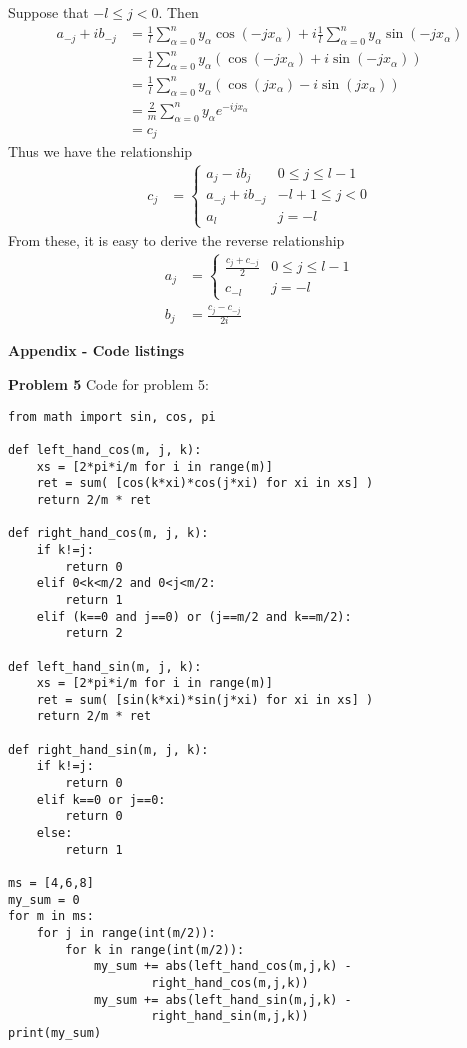 \documentclass[12pt]{article}
\newcommand{\problem}[1]{\hspace{-4 ex} \large \textbf{Problem #1} }
\begin{document}
Suppose that $-l \leq j < 0$. Then
\begin{align*}
a_{-j} + ib_{-j} & = \frac{1}{l} \sum\limits_{\alpha=0}^{n} y_\alpha \cos(-j x_\alpha) + i \frac{1}{l}\sum\limits_{\alpha=0}^{n} y_\alpha \sin(-j x_\alpha) \\
& = \frac{1}{l} \sum\limits_{\alpha=0}^{n} y_\alpha \left( \cos(-j x_\alpha) + i\sin(-j x_\alpha) \right) \\
& = \frac{1}{l} \sum\limits_{\alpha=0}^{n} y_\alpha \left( \cos(j x_\alpha) - i\sin(j x_\alpha) \right) \\
& = \frac{2}{m} \sum\limits_{\alpha=0}^{n} y_\alpha e^{-ijx_\alpha} \\
& = c_j
\end{align*}
Thus we have the relationship 
\begin{align*}
	c_j &= \begin{cases}
		a_j - ib_j & 0\leq j \leq l-1 \\
		a_{-j} + ib_{-j} & -l+1 \leq j < 0 \\
		a_{l} & j=-l
	\end{cases}
\end{align*}
From these, it is easy to derive the reverse relationship
\begin{align*}
	a_j &= \begin{cases}
		\frac{c_j + c_{-j}}{2} & 0 \leq j \leq l-1 \\
		c_{-l} & j=-l
	\end{cases} \\
	b_j &= \frac{c_j - c_{-j}}{2i}
\end{align*}

{\hspace{-4 ex} \large \textbf{Appendix - Code listings}}\bigbreak

\problem{5} Code for problem 5:
\begin{lstlisting}
from math import sin, cos, pi

def left_hand_cos(m, j, k):
	xs = [2*pi*i/m for i in range(m)]
	ret = sum( [cos(k*xi)*cos(j*xi) for xi in xs] )
	return 2/m * ret

def right_hand_cos(m, j, k):
	if k!=j:
		return 0
	elif 0<k<m/2 and 0<j<m/2:
		return 1
	elif (k==0 and j==0) or (j==m/2 and k==m/2):
		return 2	

def left_hand_sin(m, j, k):
	xs = [2*pi*i/m for i in range(m)]
	ret = sum( [sin(k*xi)*sin(j*xi) for xi in xs] )
	return 2/m * ret

def right_hand_sin(m, j, k):
	if k!=j:
		return 0
	elif k==0 or j==0:
		return 0
	else:
		return 1
		
ms = [4,6,8]
my_sum = 0
for m in ms:
	for j in range(int(m/2)):
		for k in range(int(m/2)):
			my_sum += abs(left_hand_cos(m,j,k) - 
					right_hand_cos(m,j,k))
			my_sum += abs(left_hand_sin(m,j,k) -
					right_hand_sin(m,j,k))
print(my_sum)
\end{lstlisting}
\end{document}
